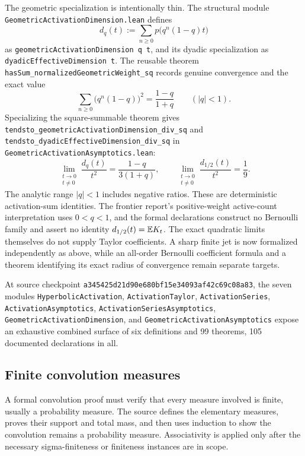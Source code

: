 \documentclass[11pt,oneside]{article}
\theoremstyle{definition}
\theoremstyle{remark}
\begin{document}
The geometric specialization is intentionally thin.  The structural module
\nolinkurl{GeometricActivationDimension.lean} defines
\[
 d_q(t):=\sum_{n\ge0}p\bigl(q^n(1-q)t\bigr)
\]
as \nolinkurl{geometricActivationDimension q t}, and its dyadic specialization
as \nolinkurl{dyadicEffectiveDimension t}.  The reusable theorem
\nolinkurl{hasSum_normalizedGeometricWeight_sq} records genuine convergence
and the exact value
\[
 \sum_{n\ge0}\bigl(q^n(1-q)\bigr)^2=\frac{1-q}{1+q}
 \qquad(|q|<1).
\]
Specializing the square-summable theorem gives
\nolinkurl{tendsto_geometricActivationDimension_div_sq} and
\nolinkurl{tendsto_dyadicEffectiveDimension_div_sq} in
\nolinkurl{GeometricActivationAsymptotics.lean}:
\[
 \boxed{
 \lim_{\substack{t\to0\\t\ne0}}\frac{d_q(t)}{t^2}
 =\frac{1-q}{3(1+q)},
 \qquad
 \lim_{\substack{t\to0\\t\ne0}}\frac{d_{1/2}(t)}{t^2}=\frac19.}
\]
The analytic range \(\lvert q\rvert<1\) includes negative ratios.  These are deterministic
activation-sum identities.  The frontier report's positive-weight active-count
interpretation uses \(0<q<1\), and the formal declarations construct no
Bernoulli family and assert no identity \(d_{1/2}(t)=\mathbb{E} K_t\).  The exact
quadratic limits themselves do not supply Taylor coefficients.  A sharp finite
jet is now formalized independently as above, while an all-order Bernoulli
coefficient formula and a theorem identifying its exact radius of convergence
remain separate targets.

At source checkpoint
\nolinkurl{a345425d21d90e680bf15e34093af42c69c08a83}, the seven modules
\nolinkurl{HyperbolicActivation}, \nolinkurl{ActivationTaylor},
\nolinkurl{ActivationSeries},
\nolinkurl{ActivationAsymptotics},
\nolinkurl{ActivationSeriesAsymptotics},
\nolinkurl{GeometricActivationDimension}, and
\nolinkurl{GeometricActivationAsymptotics} expose an exhaustive combined
surface of six definitions and 99 theorems, 105 documented declarations in
all.

\subsection{Finite convolution measures}
A formal convolution proof must verify that every measure involved is finite, usually a probability measure.  The source defines the elementary measures, proves their support and total mass, and then uses induction to show the convolution remains a probability measure.  Associativity is applied only after the necessary sigma-finiteness or finiteness instances are in scope.
\end{document}
